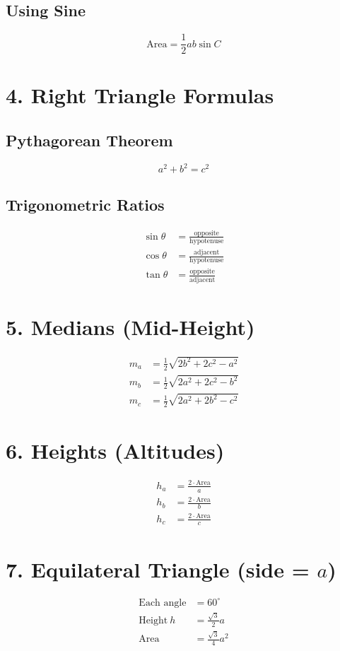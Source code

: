 \subsection*{Using Sine}
\[
\text{Area} = \frac{1}{2} ab \sin C
\]

\section*{4. Right Triangle Formulas}
\subsection*{Pythagorean Theorem}
\[
a^2 + b^2 = c^2
\]

\subsection*{Trigonometric Ratios}
\begin{align*}
\sin \theta &= \frac{\text{opposite}}{\text{hypotenuse}} \\
\cos \theta &= \frac{\text{adjacent}}{\text{hypotenuse}} \\
\tan \theta &= \frac{\text{opposite}}{\text{adjacent}}
\end{align*}

\section*{5. Medians (Mid-Height)}
\begin{align*}
m_a &= \frac{1}{2} \sqrt{2b^2 + 2c^2 - a^2} \\
m_b &= \frac{1}{2} \sqrt{2a^2 + 2c^2 - b^2} \\
m_c &= \frac{1}{2} \sqrt{2a^2 + 2b^2 - c^2}
\end{align*}

\section*{6. Heights (Altitudes)}
\begin{align*}
h_a &= \frac{2 \cdot \text{Area}}{a} \\
h_b &= \frac{2 \cdot \text{Area}}{b} \\
h_c &= \frac{2 \cdot \text{Area}}{c}
\end{align*}

\section*{7. Equilateral Triangle (side = \(a\))}
\begin{align*}
\text{Each angle} &= 60^\circ \\
\text{Height} \ h &= \frac{\sqrt{3}}{2} a \\
\text{Area} &= \frac{\sqrt{3}}{4} a^2
\end{align*}

